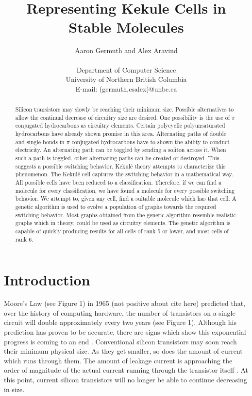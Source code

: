 \documentclass[12pt]{article}
\begin{document}
\title{Representing Kekule Cells in Stable Molecules}
\author{Aaron Germuth and Alex Aravind \\\\  
Department of Computer Science \\
University of Northern British Columbia \\
E-mail: (germuth,csalex)@unbc.ca}
\maketitle


\begin{abstract}

Silicon transistors may slowly be reaching their minimum size. Possible alternatives to allow the continual decrease of circuitry size are desired. One possibility is the use of $\pi$ conjugated hydrocarbons as circuitry elements.  Certain polycyclic polyunsaturated hydrocarbons have already shown promise in this area. Alternating paths of double and single bonds in $\pi$ conjugated hydrocarbons have to shown the ability to conduct electricity. An alternating path can be toggled by sending a soliton across it. When such a path is toggled, other alternating paths can be created or destroyed. This suggests a possible switching behavior. Kekul\'e theory attempts to characterize this phenomenon. The Kekul\'e cell captures the switching behavior in a mathematical way. All possible cells have been reduced to a classification. Therefore, if we can find a molecule for every classification, we have found a molecule for every possible switching behavior. We attempt to, given any cell, find a suitable molecule which has that cell. A genetic algorithm is used to evolve a population of graphs towards the required switching behavior. Most graphs obtained from the genetic algorithm resemble realistic graphs which in theory, could be used as circuitry elements. The genetic algorithm is capable of quickly producing results for all cells of rank 5 or lower, and most cells of rank 6.

\end{abstract}

\section{Introduction}

Moore's Law (see Figure 1) in 1965 \cite{Moore} (not positive about cite here) predicted that, over the history of computing hardware, the number of transistors on a single circuit will double approximately every two years (see Figure 1). Although his prediction has proven to be accurate, there are signs which show this exponential progress is coming to an end \cite{MooreEnd}. Conventional silicon transistors may soon reach their minimum physical size. As they get smaller, so does the amount of current which runs through them. The amount of leakage current is approaching the order of magnitude of the actual current running through the transistor itself \cite{v06}. At this point, current silicon transistors will no longer be able to continue decreasing in size.
\end{document}
